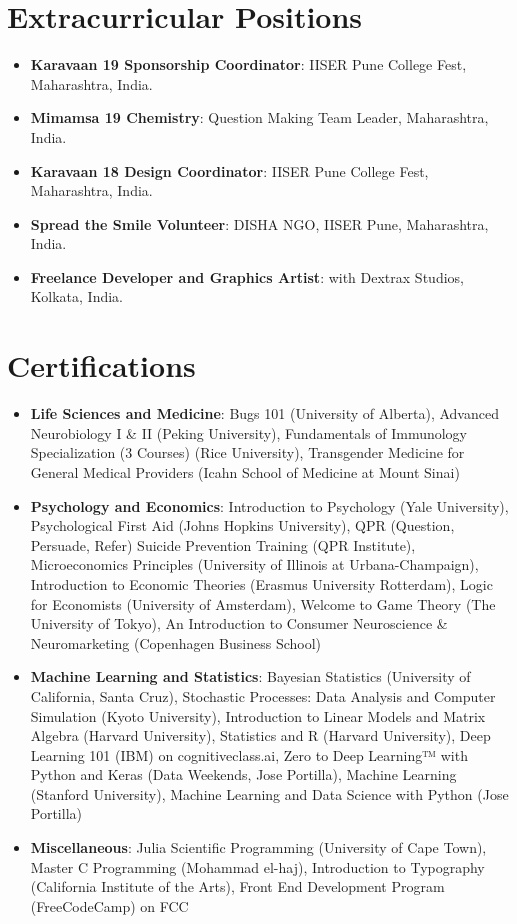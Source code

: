 \documentclass[letterpaper,9pt]{article}
\newcommand{\resumeItem}[2]{
  \item\small{
    \textbf{#1}{: #2 \vspace{-2pt}}
  }
}
\newcommand{\resumeSubItem}[2]{\resumeItem{#1}{#2}\vspace{-4pt}}
\newcommand{\resumeSubHeadingListStart}{\begin{itemize}[leftmargin=*]}
\newcommand{\resumeSubHeadingListEnd}{\end{itemize}}
\begin{document}
\section{Extracurricular Positions}
\resumeSubHeadingListStart
\resumeSubItem{Karavaan 19 Sponsorship Coordinator}{IISER Pune College Fest, Maharashtra, India.}
\resumeSubItem{Mimamsa 19 Chemistry}{Question Making Team Leader, Maharashtra, India.}
\resumeSubItem{Karavaan 18 Design Coordinator}{IISER Pune College Fest, Maharashtra, India.}
\resumeSubItem{Spread the Smile Volunteer}{DISHA NGO, IISER Pune, Maharashtra, India.}
\resumeSubItem{Freelance Developer and Graphics Artist}{with Dextrax Studios, Kolkata, India.}
\resumeSubHeadingListEnd

\section{Certifications}
\resumeSubHeadingListStart
\resumeSubItem{Life Sciences and Medicine}{Bugs 101 (University of Alberta), Advanced Neurobiology I \& II (Peking University), Fundamentals of Immunology Specialization (3 Courses) (Rice University), Transgender Medicine for General Medical Providers (Icahn School of Medicine at Mount Sinai)}
\resumeSubItem{Psychology and Economics}{Introduction to Psychology (Yale University), Psychological First Aid (Johns Hopkins University), QPR (Question, Persuade, Refer) Suicide Prevention Training (QPR Institute), Microeconomics Principles (University of Illinois at Urbana-Champaign), Introduction to Economic Theories (Erasmus University Rotterdam), Logic for Economists (University of Amsterdam), Welcome to Game Theory (The University of Tokyo), An Introduction to Consumer Neuroscience \& Neuromarketing (Copenhagen Business School)}
\resumeSubItem{Machine Learning and Statistics}{Bayesian Statistics (University of California, Santa Cruz), Stochastic Processes: Data Analysis and Computer Simulation (Kyoto University), Introduction to Linear Models and Matrix Algebra (Harvard University), Statistics and R (Harvard University), Deep Learning 101 (IBM) on cognitiveclass.ai, Zero to Deep Learning™ with Python and Keras (Data Weekends, Jose Portilla), Machine Learning (Stanford University), Machine Learning and Data Science with Python (Jose Portilla)}
\resumeSubItem{Miscellaneous}{Julia Scientific Programming (University of Cape Town), Master C Programming (Mohammad el-haj), Introduction to Typography (California Institute of the Arts), Front End Development Program (FreeCodeCamp) on FCC}
\resumeSubHeadingListEnd

\end{document}
